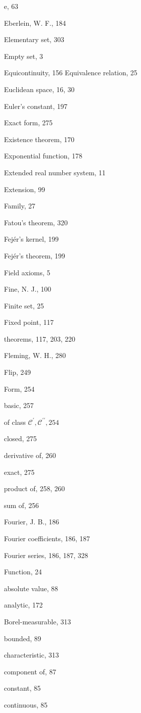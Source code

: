 \documentclass[10pt]{article}
\begin{document}
e, 63

Eberlein, W. F., 184

Elementary set, 303

Empty set, 3

Equicontinuity, 156
Equivalence relation, 25

Euclidean space, 16, 30

Euler's constant, 197

Exact form, 275

Existence theorem, 170

Exponential function, 178

Extended real number system, 11

Extension, 99

Family, 27

Fatou's theorem, 320

Fejér's kernel, 199

Fejér's theorem, 199

Field axioms, 5

Fine, N. J., 100

Finite set, 25

Fixed point, 117

theorems, 117, 203, 220

Fleming, W. H., 280

Flip, 249

Form, 254

basic, 257

of class $\mathscr{C}^{\prime}, \mathscr{C}^{\prime \prime}, 254$

closed, 275

derivative of, 260

exact, 275

product of, 258, 260

sum of, 256

Fourier, J. B., 186

Fourier coefficients, 186, 187

Fourier series, 186, 187, 328

Function, 24

absolute value, 88

analytic, 172

Borel-measurable, 313

bounded, 89

characteristic, 313

component of, 87

constant, 85

continuous, 85
\end{document}
